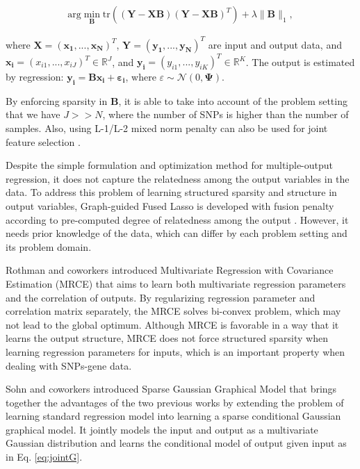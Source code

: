 \documentclass{article}
\begin{document}
\begin{align}\label{eq:lasso}
\text{arg} \min_{\textbf{B}} \text{tr}((\mathbf{Y}-\mathbf{XB})(\mathbf{Y}-\mathbf{XB})^T) + \lambda \| \mathbf{B}\|_1,
\end{align}

where $\mathbf{X}=(\mathbf{x_1}, ... ,\mathbf{x_N})^T$, $\mathbf{Y}=(\mathbf{y_1}, ... ,\mathbf{y_N})^T$ are input and output data, and $\mathbf{x_i}=(x_{i1}, ... ,x_{iJ})^T \in \mathbb{R}^J$, and $\mathbf{y_i}=(y_{i1}, ... ,y_{iK})^T \in \mathbb{R}^K$.
The output is estimated by regression: $\mathbf{y_i}=\mathbf{Bx_i}+\mathbf{\varepsilon_i}$, where $\varepsilon  \sim \mathcal{N}(0, \mathbf{\Psi})$.

By enforcing sparsity in \textbf{B}, it is able to take into account of the problem setting that we have $J >> N$, where the number of SNPs is higher than the number of samples. Also, using L-1/L-2 mixed norm penalty can also be used for joint feature selection \cite{obozinski2008high}.



Despite the simple formulation and optimization method for multiple-output regression, it does not capture the relatedness among the output variables in the data. To address this problem of learning structured sparsity and structure in output variables, Graph-guided Fused Lasso is developed with fusion penalty according to pre-computed degree of relatedness among the output \cite{kim2009statistical}. However, it needs prior knowledge of the data, which can differ by each problem setting and its problem domain. 

Rothman and coworkers \cite{rothman2010sparse} introduced Multivariate Regression with Covariance Estimation (MRCE) that aims to learn both multivariate regression parameters and the correlation of outputs. By regularizing regression parameter and correlation matrix separately, the MRCE solves bi-convex problem, which may not lead to the global optimum. Although MRCE is favorable in a way that it learns the output structure, MRCE does not force structured sparsity when learning regression parameters for inputs, which is an important property when dealing with SNPs-gene data.


Sohn and coworkers \cite{sohn2012joint} introduced Sparse Gaussian Graphical Model that brings together the advantages of the two previous works by extending the problem of learning standard regression model into learning a sparse conditional Gaussian graphical model. It jointly models the input and output as a multivariate Gaussian distribution and learns the conditional model of output given input as in Eq. \ref{eq:jointG}.
\end{document}
